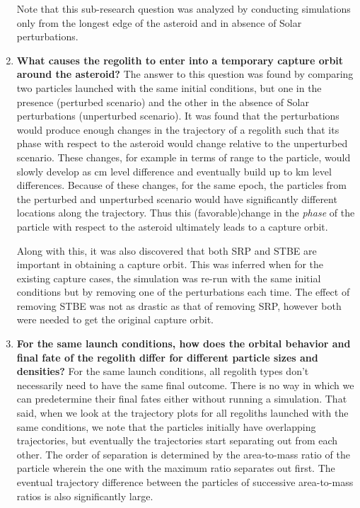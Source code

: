 \begin{enumerate}
Note that this sub-research question was analyzed by conducting simulations only from the longest edge of the asteroid and in absence of Solar perturbations.

\item \textbf{What causes the regolith to enter into a temporary capture orbit around the asteroid?}\newline
The answer to this question was found by comparing two particles launched with the same initial conditions, but one in the presence (perturbed scenario) and the other in the absence of Solar perturbations (unperturbed scenario). It was found that the perturbations would produce enough changes in the trajectory of a regolith such that its phase with respect to the asteroid would change relative to the unperturbed scenario. These changes, for example in terms of range to the particle, would slowly develop as cm level difference and eventually build up to km level differences. Because of these changes, for the same epoch, the particles from the perturbed and unperturbed scenario would have significantly different locations along the trajectory. Thus this (favorable)change in the \emph{phase} of the particle with respect to the asteroid ultimately leads to a capture orbit.

Along with this, it was also discovered that both \gls{SRP} and \gls{STBE} are important in obtaining a capture orbit. This was inferred when for the existing capture cases, the simulation was re-run with the same initial conditions but by removing one of the perturbations each time. The effect of removing \gls{STBE} was not as drastic as that of removing \gls{SRP}, however both were needed to get the original capture orbit.

\item \textbf{For the same launch conditions, how does the orbital behavior and final fate of the regolith differ for different particle sizes and densities?}\newline
For the same launch conditions, all regolith types don't necessarily need to have the same final outcome. There is no way in which we can predetermine their final fates either without running a simulation. That said, when we look at the trajectory plots for all regoliths launched with the same conditions, we note that the particles initially have overlapping trajectories, but eventually the trajectories start separating out from each other. The order of separation is determined by the area-to-mass ratio of the particle wherein the one with the maximum ratio separates out first. The eventual trajectory difference between the particles of successive area-to-mass ratios is also significantly large.


\end{enumerate}
